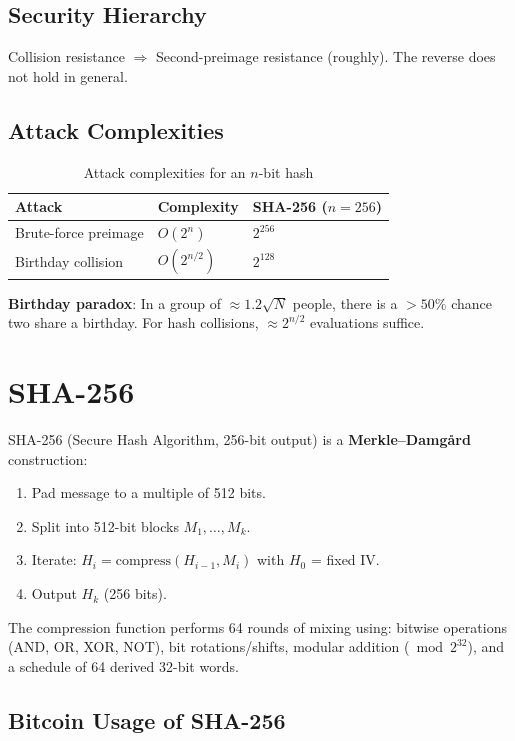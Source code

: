 \documentclass[12pt,a4paper,openany]{book}
\theoremstyle{definition}
\theoremstyle{plain}
\theoremstyle{remark}
\begin{document}
\subsection{Security Hierarchy}

Collision resistance $\Rightarrow$ Second-preimage resistance (roughly).
The reverse does not hold in general.

\subsection{Attack Complexities}

\begin{table}[h]
\centering
\caption{Attack complexities for an $n$-bit hash}
\begin{tabular}{lll}
\toprule
\textbf{Attack} & \textbf{Complexity} & \textbf{SHA-256 ($n=256$)} \\
\midrule
Brute-force preimage & $O(2^n)$ & $2^{256}$ \\
Birthday collision   & $O(2^{n/2})$ & $2^{128}$ \\
\bottomrule
\end{tabular}
\end{table}

\textbf{Birthday paradox}: In a group of $\approx 1.2\sqrt{N}$ people,
there is a $>50\%$ chance two share a birthday.  For hash collisions,
$\approx 2^{n/2}$ evaluations suffice.

\section{SHA-256}

SHA-256 (Secure Hash Algorithm, 256-bit output) is a
\textbf{Merkle--Damg\aa rd} construction:
\begin{enumerate}
  \item Pad message to a multiple of 512 bits.
  \item Split into 512-bit blocks $M_1,\ldots,M_k$.
  \item Iterate: $H_i = \text{compress}(H_{i-1},M_i)$ with $H_0$ = fixed IV.
  \item Output $H_k$ (256 bits).
\end{enumerate}

The compression function performs 64 rounds of mixing using:
bitwise operations (AND, OR, XOR, NOT), bit rotations/shifts, modular
addition ($\bmod 2^{32}$), and a schedule of 64 derived 32-bit words.

\subsection{Bitcoin Usage of SHA-256}
\end{document}
